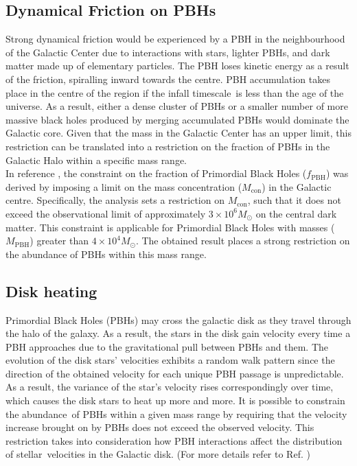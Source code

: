 \subsection{Dynamical Friction on PBHs}
Strong dynamical friction would be experienced by a PBH in the neighbourhood of the Galactic Center due to interactions with stars, lighter PBHs, and dark matter made up of elementary particles. The PBH loses kinetic energy as a result of the friction, spiralling inward towards the centre. PBH accumulation takes place in the centre of the region if the infall timescale is less than the age of the universe. As a result, either a dense cluster of PBHs or a smaller number of more massive black holes produced by merging accumulated PBHs would dominate the Galactic core. 
Given that the mass in the Galactic Center has an upper limit, this restriction can be translated into a restriction on the fraction of PBHs in the Galactic Halo within a specific mass range.\\
In reference \cite{1999ApJ...516..195C}, the constraint on the fraction of Primordial Black Holes ($f_{\text{PBH}}$) was derived by imposing a limit on the mass concentration ($M_{\text{con}}$) in the Galactic centre. Specifically, the analysis sets a restriction on $M_{\text{con}}$, such that it does not exceed the observational limit of approximately $3 \times 10^6 M_{\odot}$ on the central dark matter. This constraint is applicable for Primordial Black Holes with masses ($M_{\text{PBH}}$) greater than $4 \times 10^4 M_{\odot}$. The obtained result places a strong restriction on the abundance of PBHs within this mass range.


\subsection{Disk heating}

Primordial Black Holes (PBHs) may cross the galactic disk as they travel through the halo of the galaxy. As a result, the stars in the disk gain velocity every time a PBH approaches due to the gravitational pull between PBHs and them. The evolution of the disk stars' velocities exhibits a random walk pattern since the direction of the obtained velocity for each unique PBH passage is unpredictable. As a result, the variance of the star's velocity rises correspondingly over time, which causes the disk stars to heat up more and more.
It is possible to constrain the abundance of PBHs within a given mass range by requiring that the velocity increase brought on by PBHs does not exceed the observed velocity. This restriction takes into consideration how PBH interactions affect the distribution of stellar velocities in the Galactic disk.
(For more details refer to Ref. \cite{1999ApJ...516..195C})



